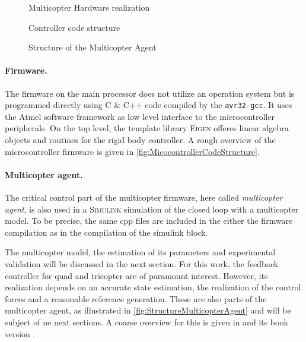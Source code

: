 \begin{figure}[p]
 \centering
 \footnotesize
 \newcommand{\macGroundstation}{\textcolor{white}{\textbf{Groundstation} (Win7 PC)}}
 \newcommand{\macMulticopterRealization}{\textcolor{white}{\textbf{Multicopter}}}
 \newcommand{\macRBSI}{\textcolor{white}{\textbf{rigid}}}
 \newcommand{\macRBSII}{\textcolor{white}{\textbf{body}}}
 \newcommand{\macRBSIII}{\textcolor{white}{\textbf{system}}}
 \newcommand{\macMCI}{\textcolor{white}{\textbf{main}}}
 \newcommand{\macMCII}{\textcolor{white}{\textbf{controller}}}
 
 \caption{Multicopter Hardware realization}
 \label{fig:MulticopterRealizationOverview}
\vspace{5mm}
 
 \caption{Controller code structure}
 \label{fig:MicocontrollerCodeStructure}
\vspace{5mm}
 \footnotesize
 
 \caption{Structure of the Multicopter Agent}
 \label{fig:StructureMulticopterAgent}
\end{figure}


\paragraph{Firmware.}
The firmware on the main processor does not utilize an operation system but is programmed directly using C \& C++ code compiled by the \texttt{avr32-gcc}.
It uses the Atmel software framework as low level interface to the microcontroller peripherals.
On the top level, the template library \textsc{Eigen} offeres linear algebra objects and routines for the rigid body controller.
A rough overview of the microcontroller firmware is given in \autoref{fig:MicocontrollerCodeStructure}.

\paragraph{Multicopter agent.}
The critical control part of the multicopter firmware, here called \textit{multicopter agent}, is also used in a \textsc{Simulink} simulation of the closed loop with a multicopter model.
To be precise, the same cpp files are included in the either the firmware compilation as in the compilation of the simulink block. 

The multicopter model, the estimation of its parameters and experimental validation will be discussed in the next section.
For this work, the feedback controller for quad and tricopter are of paramount interest.
However, its realization depends on an accurate state estimation, the realization of the control forces and a reasonable reference generation.
These are also parts of the multicopter agent, as illustrated in \autoref{fig:StructureMulticopterAgent} and will be subject of ne next sections.
A coarse overview for this is given in  \cite{Konz:Mechatronics} and its book version \cite{Konz:MechatronicsBook}.